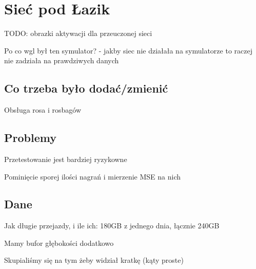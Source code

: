 \chapter{Sieć pod Łazik}
TODO:  obrazki aktywacji dla przeuczonej sieci

Po co wgl był ten symulator? - jakby siec nie działała na symulatorze 
to raczej nie zadziała na prawdziwych danych

\section{Co trzeba było dodać/zmienić}
Obsługa rosa i rosbagów

\section{Problemy}
Przetestowanie jest bardziej ryzykowne

Pominięcie sporej ilości nagrań i mierzenie MSE na nich

\section{Dane}
Jak długie przejazdy, i ile ich: 180GB z jednego dnia, łącznie 240GB

Mamy bufor głębokości dodatkowo

Skupialiśmy się na tym żeby widział kratkę (kąty proste)



